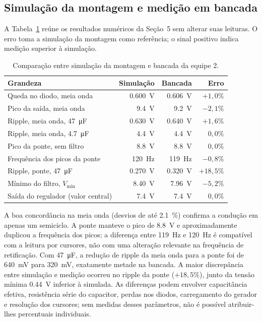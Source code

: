 \documentclass[11pt,a4paper]{article}
\begin{document}
\subsection{Simulação da montagem e medição em bancada}

A Tabela~\ref{tab:discussao_sim_bancada} reúne os resultados numéricos da Seção~5 sem alterar suas leituras. O erro toma a simulação da montagem como referência; o sinal positivo indica medição superior à simulação.

\begin{table}[H]
\centering
\small
\caption{Comparação entre simulação da montagem e bancada da equipe 2.}
\label{tab:discussao_sim_bancada}
\begin{tabular}{@{}p{6.6cm}rrr@{}}
\toprule
\textbf{Grandeza} & \textbf{Simulação} & \textbf{Bancada} & \textbf{Erro} \\
\midrule
Queda no diodo, meia onda & \SI{0,600}{\volt} & \SI{0,606}{\volt} & \(+1,0\%\) \\
Pico da saída, meia onda & \SI{9,4}{\volt} & \SI{9,2}{\volt} & \(-2,1\%\) \\
Ripple, meia onda, \SI{47}{\micro\farad} & \SI{0,630}{\volt} & \SI{0,640}{\volt} & \(+1,6\%\) \\
Ripple, meia onda, \SI{4,7}{\micro\farad} & \SI{4,4}{\volt} & \SI{4,4}{\volt} & \(0,0\%\) \\
Pico da ponte, sem filtro & \SI{8,8}{\volt} & \SI{8,8}{\volt} & \(0,0\%\) \\
Frequência dos picos da ponte & \SI{120}{\hertz} & \SI{119}{\hertz} & \(-0,8\%\) \\
Ripple, ponte, \SI{47}{\micro\farad} & \SI{0,270}{\volt} & \SI{0,320}{\volt} & \(+18,5\%\) \\
Mínimo do filtro, \(V_{\min}\) & \SI{8,40}{\volt} & \SI{7,96}{\volt} & \(-5,2\%\) \\
Saída do regulador (valor central) & \SI{7,4}{\volt} & \SI{7,4}{\volt} & \(0,0\%\) \\
\bottomrule
\end{tabular}
\end{table}

A boa concordância na meia onda (desvios de até \SI{2,1}{\percent}) confirma a condução em apenas um semiciclo. A ponte manteve o pico de \SI{8,8}{\volt} e aproximadamente duplicou a frequência dos picos; a diferença entre \SI{119}{\hertz} e \SI{120}{\hertz} é compatível com a leitura por cursores, não com uma alteração relevante na frequência de retificação. Com \SI{47}{\micro\farad}, a redução de ripple da meia onda para a ponte foi de \SI{640}{\milli\volt} para \SI{320}{\milli\volt}, exatamente metade na bancada. A maior discrepância entre simulação e medição ocorreu no ripple da ponte (\(+18,5\%\)), junto da tensão mínima \SI{0,44}{\volt} inferior à simulada. As diferenças podem envolver capacitância efetiva, resistência série do capacitor, perdas nos diodos, carregamento do gerador e resolução dos cursores; sem medidas desses parâmetros, não é possível atribuir-lhes percentuais individuais.
\end{document}

